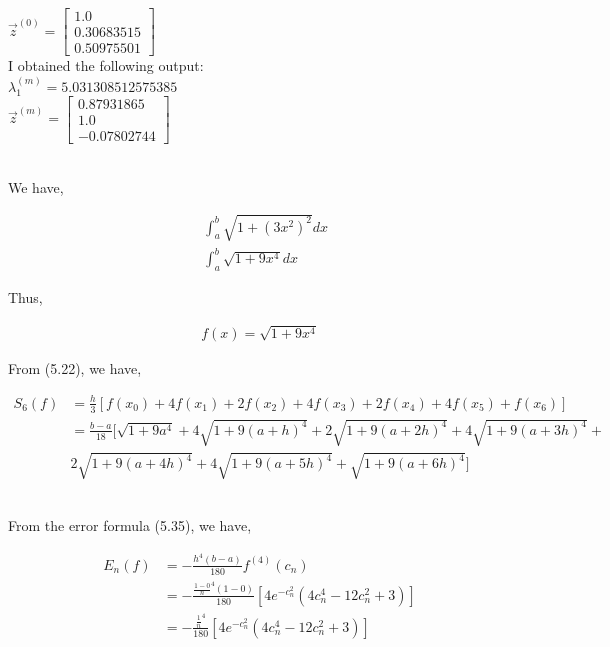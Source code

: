 \documentclass[12pt]{article}
\newenvironment{problem}[2][Problem]{\begin{trivlist}
\item[\hskip \labelsep {\bfseries #1}\hskip \labelsep {\bfseries #2.}]}{\end{trivlist}}
\begin{document}
$\vec{z}^{(0)} = \begin{bmatrix}1.0\\0.30683515\\0.50975501\end{bmatrix}$\\

I obtained the following output:\\

$\lambda^{(m)}_1 = 5.031308512575385$\\

$\vec{z}^{(m)} = \begin{bmatrix}0.87931865\\1.0\\-0.07802744\end{bmatrix}$\\
\\
\begin{problem}{3}
\end{problem}

We have,

\begin{align*}
	&\int_{a}^{b} \sqrt{1 + (3x^2)^2} dx\\
	&\int_{a}^{b} \sqrt{1 + 9x^4} dx
\end{align*}

Thus,

\begin{align*}
	f(x) = \sqrt{1 + 9x^4}
\end{align*}

From (5.22), we have,

\begin{align*}
	S_6(f) &= \frac{h}{3}[f(x_0) + 4f(x_1) + 2f(x_2) + 4f(x_3) + 2f(x_4) + 4f(x_5) + f(x_6)]\\
	&= \frac{b-a}{18}[\sqrt{1+9a^4} + 4\sqrt{1+9(a+h)^4} + 2\sqrt{1+9(a+2h)^4} + 4\sqrt{1+9(a+3h)^4} +\\
	&2\sqrt{1+9(a+4h)^4} + 4\sqrt{1+9(a+5h)^4} + \sqrt{1+9(a+6h)^4}]
\end{align*}
\\
\begin{problem}{4}
\end{problem}

From the error formula (5.35), we have,

\begin{align*}
	E_n(f) &= -\frac{h^4(b-a)}{180}f^{(4)}(c_n)\\
	&= -\frac{\frac{1-0}{n}^4(1-0)}{180}[4e^{-c_n^2}(4c_n^4 - 12c_n^2 + 3)]\\
	&= -\frac{\frac{1}{n}^4}{180}[4e^{-c_n^2}(4c_n^4 - 12c_n^2 + 3)]
\end{align*}
\end{document}
